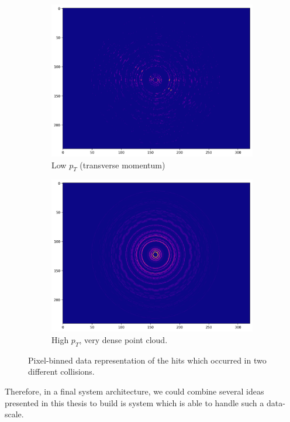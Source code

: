 \begin{figure}[H]
  \centering
  \begin{subfigure}{.48\textwidth}
    \centering
    \includegraphics[width=\linewidth]{resources/images/experiment_cms_tracking_1}
    \caption{Low $p_T$ (transverse momentum)}
    \label{fig:experiment_cms_input_1}
  \end{subfigure}
  \begin{subfigure}{.48\textwidth}
    \centering
    \includegraphics[width=\linewidth]{resources/images/experiment_cms_tracking_2}
    \caption{High $p_T$, very dense point cloud.}
    \label{fig:experiment_cms_input_2}
  \end{subfigure}
  \caption{Pixel-binned data representation of the hits which occurred in two different collisions.}
  \label{fig:experiment_cms_tracking}
\end{figure}

Therefore, in a final system architecture, we could combine several ideas presented in this thesis to build is system which is able to handle such a data-scale.
